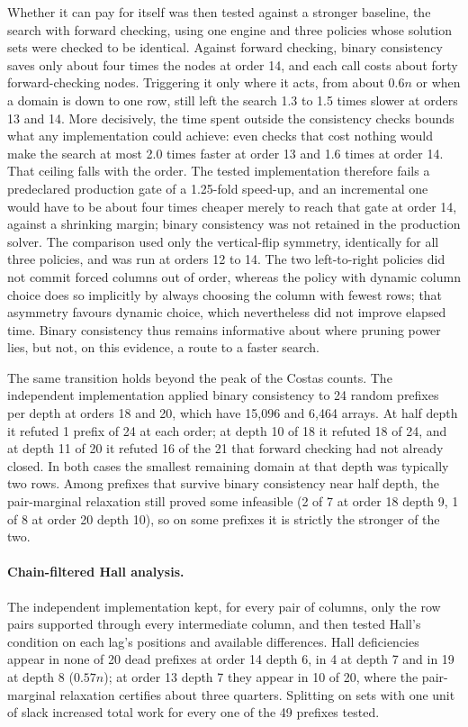 Whether it can pay for itself was then tested against a stronger baseline, the search with forward
checking, using one engine and three policies whose solution sets were checked to be identical. Against
forward checking, binary consistency saves only about four times the nodes at order 14, and each call
costs about forty forward-checking nodes. Triggering it only where it acts, from about $0.6n$ or when a
domain is down to one row, still left the search 1.3 to 1.5 times slower at orders 13 and 14. More
decisively, the time spent outside the consistency checks bounds what any implementation could achieve:
even checks that cost nothing would make the search at most 2.0 times faster at order 13 and 1.6 times at
order 14. That ceiling falls with the order. The tested implementation therefore fails a predeclared
production gate of a 1.25-fold speed-up, and an incremental one would have to be about four times cheaper
merely to reach that gate at order 14, against a shrinking margin; binary consistency was not retained in
the production solver. The comparison used only the vertical-flip symmetry, identically for all three
policies, and was run at orders 12 to 14. The two left-to-right policies did not commit forced columns out
of order, whereas the policy with dynamic column choice does so implicitly by always choosing the column
with fewest rows; that asymmetry favours dynamic choice, which nevertheless did not improve elapsed time.
Binary consistency thus remains informative about where pruning power lies, but not, on this evidence, a
route to a faster search.

The same transition holds beyond the peak of the Costas counts. The independent implementation applied
binary consistency to 24 random prefixes per depth at orders 18 and 20, which have 15{,}096 and 6{,}464
arrays. At half depth it refuted 1 prefix of 24 at each order; at depth 10 of 18 it refuted 18 of 24, and at
depth 11 of 20 it refuted 16 of the 21 that forward checking had not already closed. In both cases the
smallest remaining domain at that depth was typically two rows. Among prefixes that survive binary
consistency near half depth, the pair-marginal relaxation still proved some infeasible (2 of 7 at order 18
depth 9, 1 of 8 at order 20 depth 10), so on some prefixes it is strictly the stronger of the two.

\paragraph{Chain-filtered Hall analysis.} The independent implementation kept, for every pair of columns,
only the row pairs supported through every intermediate column, and then tested Hall's condition on each
lag's positions and available differences. Hall deficiencies appear in none of 20 dead prefixes at order 14
depth 6, in 4 at depth 7 and in 19 at depth 8 ($0.57n$); at order 13 depth 7 they appear in 10 of 20,
where the pair-marginal relaxation certifies about three quarters. Splitting on sets with one unit of slack
increased total work for every one of the 49 prefixes tested.


